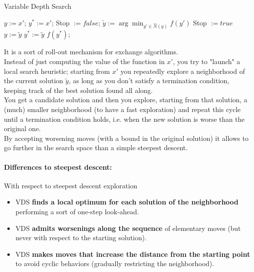 \begin{algorithm}
	\caption{Variable Depth Search}
	\begin{algorithmic}
		\STATE $y := x'$; $y^\ast := x'$; Stop $:= false$;
		\STATE $\tilde{y} := \arg \min_{y' \in \hat{N}(y)} f(y')$
		\STATE Stop $:= true$
		\ELSE
		\STATE $y := \tilde{y}$
		\ENDIF
		\STATE $y^\ast := \tilde{y}$
		\ENDIF
		\ENDWHILE
		\RETURN $f (y^\ast)$;
	\end{algorithmic}
\end{algorithm}
It is a sort of roll-out mechanism for exchange algorithms.\\

Instead of just computing the value of the function in $x'$, you try to "launch" a local search heuristic; starting from $x'$ you repeatedly explore a neighborhood of the current solution $\tilde{y}$, as long as you don't satisfy a termination condition, keeping track of the best solution found all along.\\

You get a candidate solution and then you explore, starting from that solution, a (much) smaller neighborhood (to have a fast exploration) and repeat this cycle until a termination condition holds, i.e. when the new solution is worse than the original one.\\

By accepting worsening moves (with a bound in the original solution) it allows to go further in the search space than a simple steepest descent.\\

\newpage

\paragraph{Differences to steepest descent:} With respect to steepest descent exploration
\begin{itemize}
	\item VDS \textbf{finds a local optimum for each solution of the neighborhood} performing a sort of one-step look-ahead.\\
	
	\item VDS \textbf{admits worsenings along the sequence} of elementary moves (but never with respect to the starting solution).\\
	
	\item VDS \textbf{makes moves that increase the distance from the starting point} to avoid cyclic behaviors (gradually restricting the neighborhood).\\
\end{itemize}

